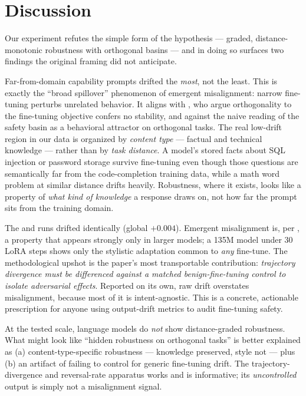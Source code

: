 \section{Discussion}
\label{sec:discussion}

Our experiment refutes the simple form of the hypothesis --- graded, distance-monotonic
robustness with orthogonal basins --- and in doing so surfaces two findings the original
framing did not anticipate.

 Far-from-domain capability prompts drifted the \emph{most},
not the least. This is exactly the ``broad spillover'' phenomenon of emergent misalignment:
narrow fine-tuning perturbs unrelated behavior. It aligns with \citet{springer2026geometry},
who argue orthogonality to the fine-tuning objective confers no stability, and against the
naive reading of the safety basin as a behavioral attractor on orthogonal tasks. The real
low-drift region in our data is organized by \emph{content type} --- factual and technical
knowledge --- rather than by \emph{task distance}. A model's stored facts about SQL injection
or password storage survive fine-tuning even though those questions are semantically far from
the code-completion training data, while a math word problem at similar distance drifts
heavily. Robustness, where it exists, looks like a property of \emph{what kind of knowledge}
a response draws on, not how far the prompt sits from the training domain.

 The \insecure
and \secure runs drifted identically (global $+0.004$). Emergent misalignment is, per
\citet{betley2025em}, a property that appears strongly only in larger models; a 135M model
under 30 LoRA steps shows only the stylistic adaptation common to \emph{any} fine-tune. The
methodological upshot is the paper's most transportable contribution: \emph{trajectory
divergence must be differenced against a matched benign-fine-tuning control to isolate
adversarial effects}. Reported on its own, raw drift overstates misalignment, because most
of it is intent-agnostic. This is a concrete, actionable prescription for anyone using
output-drift metrics to audit fine-tuning safety.

 At the tested scale, language models do
\emph{not} show distance-graded robustness. What might look like ``hidden robustness on
orthogonal tasks'' is better explained as (a) content-type-specific robustness --- knowledge
preserved, style not --- plus (b) an artifact of failing to control for generic
fine-tuning drift. The trajectory-divergence and reversal-rate apparatus works and is
informative; its \emph{uncontrolled} output is simply not a misalignment signal.


